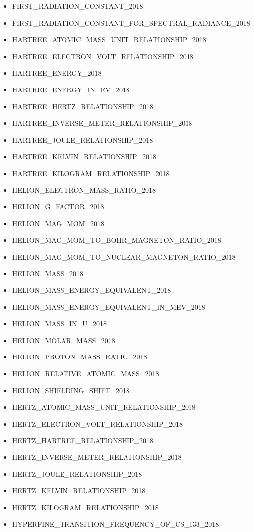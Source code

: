 \begin{itemize}
\item FIRST\_RADIATION\_CONSTANT\_2018
\item FIRST\_RADIATION\_CONSTANT\_FOR\_SPECTRAL\_RADIANCE\_2018
\item HARTREE\_ATOMIC\_MASS\_UNIT\_RELATIONSHIP\_2018
\item HARTREE\_ELECTRON\_VOLT\_RELATIONSHIP\_2018
\item HARTREE\_ENERGY\_2018
\item HARTREE\_ENERGY\_IN\_EV\_2018
\item HARTREE\_HERTZ\_RELATIONSHIP\_2018
\item HARTREE\_INVERSE\_METER\_RELATIONSHIP\_2018
\item HARTREE\_JOULE\_RELATIONSHIP\_2018
\item HARTREE\_KELVIN\_RELATIONSHIP\_2018
\item HARTREE\_KILOGRAM\_RELATIONSHIP\_2018
\item HELION\_ELECTRON\_MASS\_RATIO\_2018
\item HELION\_G\_FACTOR\_2018
\item HELION\_MAG\_MOM\_2018
\item HELION\_MAG\_MOM\_TO\_BOHR\_MAGNETON\_RATIO\_2018
\item HELION\_MAG\_MOM\_TO\_NUCLEAR\_MAGNETON\_RATIO\_2018
\item HELION\_MASS\_2018
\item HELION\_MASS\_ENERGY\_EQUIVALENT\_2018
\item HELION\_MASS\_ENERGY\_EQUIVALENT\_IN\_MEV\_2018
\item HELION\_MASS\_IN\_U\_2018
\item HELION\_MOLAR\_MASS\_2018
\item HELION\_PROTON\_MASS\_RATIO\_2018
\item HELION\_RELATIVE\_ATOMIC\_MASS\_2018
\item HELION\_SHIELDING\_SHIFT\_2018
\item HERTZ\_ATOMIC\_MASS\_UNIT\_RELATIONSHIP\_2018
\item HERTZ\_ELECTRON\_VOLT\_RELATIONSHIP\_2018
\item HERTZ\_HARTREE\_RELATIONSHIP\_2018
\item HERTZ\_INVERSE\_METER\_RELATIONSHIP\_2018
\item HERTZ\_JOULE\_RELATIONSHIP\_2018
\item HERTZ\_KELVIN\_RELATIONSHIP\_2018
\item HERTZ\_KILOGRAM\_RELATIONSHIP\_2018
\item HYPERFINE\_TRANSITION\_FREQUENCY\_OF\_CS\_133\_2018

\end{itemize}
